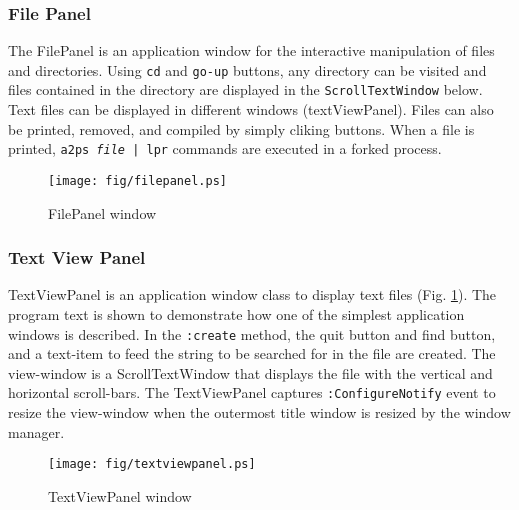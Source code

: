\begin{refdesc}

\end{refdesc}

\subsubsection{File Panel}
The FilePanel is an application window for the interactive  manipulation
of files and directories.
Using {\tt cd} and {\tt go-up} buttons, any directory can be visited
and files contained in the directory are displayed in the {\tt ScrollTextWindow}
below.
Text files can be displayed in different windows (textViewPanel).
Files can also be printed, removed, and compiled by simply cliking buttons.
When a file is printed, {\tt a2ps {\em file} | lpr} commands are executed
in a forked process.

\begin{figure}
\begin{center}
\texttt{[image: fig/filepanel.ps]}
\end{center}
\caption{FilePanel window}
\end{figure}

\subsubsection{Text View Panel}

TextViewPanel is an application window class to display text files
(Fig. \ref{textviewpanel}).
The program text is shown to demonstrate how 
one of the simplest application windows is described.
In the {\tt :create} method, the quit button and find button,
and a text-item to feed the string to be searched for in the file
are created.
The view-window is a ScrollTextWindow that displays the file
with the vertical and horizontal scroll-bars.
The TextViewPanel captures {\tt :ConfigureNotify} event
to resize the view-window when the outermost title window is resized
by the window manager.

\begin{figure}
\begin{center}
\texttt{[image: fig/textviewpanel.ps]}
\end{center}
\caption{TextViewPanel window\label{textviewpanel}}
\end{figure}

